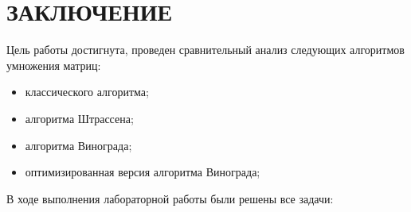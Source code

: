 \chapter*{ЗАКЛЮЧЕНИЕ}


Цель работы достигнута, проведен сравнительный анализ следующих алгоритмов умножения матриц:
\begin{itemize}
	\item классического алгоритма;
	\item алгоритма Штрассена;
	\item алгоритма Винограда;
	\item оптимизированная версия алгоритма Винограда;
\end{itemize}

В ходе выполнения лабораторной работы были решены все задачи:
